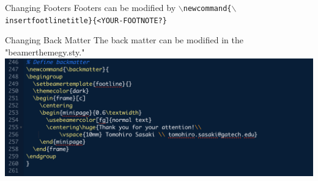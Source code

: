 \documentclass{beamer}
\newcommand{\hrefcol}[2]{\textcolor{gtbuzzgold}{\href{#1}{#2}}}
\begin{document}
\begin{frame}{Changing Footers}
    Footers can be modified by
    \texttt{$\backslash$newcommand\{$\backslash$insertfootlinetitle\}\{<YOUR-FOOTNOTE?\}}
\end{frame}

\begin{frame}{Changing Back Matter}
    The back matter can be modified in the "beamerthemegy.sty."  
    \includegraphics[width=\textwidth]{plots/backmatter.png}
\end{frame}


\end{document}
